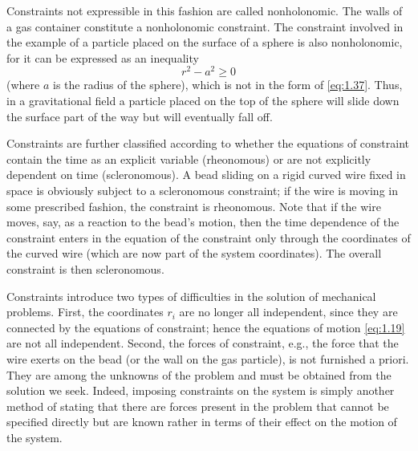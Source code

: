 Constraints not expressible in this fashion are called nonholonomic. The walls of a gas container constitute a nonholonomic constraint. The constraint involved in the example of a particle placed on the surface of a sphere is also nonholonomic, for it can be expressed as an inequality
\begin{equation*}
    r^2-a^2\geqslant0
\end{equation*}
(where \(a\) is the radius of the sphere), which is not in the form of \eqref{eq:1.37}. Thus, in a gravitational field a particle placed on the top of the sphere will slide down the surface part of the way but will eventually fall off.

Constraints are further classified according to whether the equations of constraint contain the time as an explicit variable (rheonomous) or are not explicitly dependent on time (scleronomous). A bead sliding on a rigid curved wire fixed in space is obviously subject to a scleronomous constraint; if the wire is moving in some prescribed fashion, the constraint is rheonomous. Note that if the wire moves, say, as a reaction to the bead's motion, then the time dependence of the constraint enters in the equation of the constraint only through the coordinates of the curved wire (which are now part of the system coordinates). The overall constraint is then scleronomous.

Constraints introduce two types of difficulties in the solution of mechanical problems. First, the coordinates \(r_i\) are no longer all independent, since they are connected by the equations of constraint; hence the equations of motion \eqref{eq:1.19} are not all independent. Second, the forces of constraint, e.g., the force that the wire exerts on the bead (or the wall on the gas particle), is not furnished a priori. They are among the unknowns of the problem and must be obtained from the solution we seek. Indeed, imposing constraints on the system is simply another method of stating that there are forces present in the problem that cannot be specified directly but are known rather in terms of their effect on the motion of the system.

